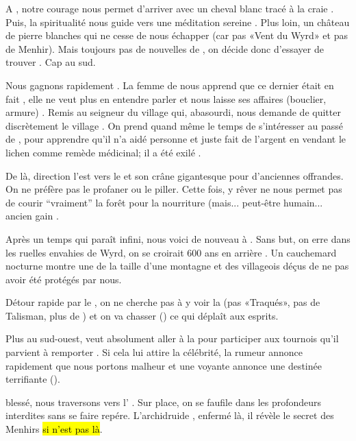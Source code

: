 \documentclass[11pt]{article}
\begin{document}
A \murmures{}, notre courage nous permet d'arriver avec un cheval blanc tracé à la craie . Puis, la spiritualité nous guide vers une méditation sereine . Plus loin, un château de pierre blanches qui ne cesse de nous échapper (car pas «Vent du Wyrd» et pas de Menhir). Mais toujours pas de nouvelles de \neante{}, on décide donc d'essayer de trouver \orrin{}. Cap au sud.

Nous gagnons rapidement \blanc{}. La femme de \fael{} nous apprend que ce dernier était en fait \galaad{}, elle ne veut plus en entendre parler et nous laisse ses affaires (bouclier, armure) . Remis au seigneur du village qui, abasourdi, nous demande de quitter discrètement le village . On prend quand même le temps de s'intéresser au passé de \breagach{}, pour apprendre qu'il n'a aidé personne et juste fait de l'argent en vendant le lichen comme remède médicinal; il a été exilé .

De là, direction l'est vers le \bosquet{}  et son crâne gigantesque pour d'anciennes offrandes. On ne préfère pas le profaner ou le piller. Cette fois, y rêver ne nous permet pas de courir ``vraiment'' la forêt pour la nourriture (mais... peut-être humain... ancien gain .

Après un temps qui paraît infini, nous voici de nouveau à \cuanacht{}. Sans but, on erre dans les ruelles envahies de Wyrd, on se croirait 600 ans en arrière \gain{\terror[3], \magic[1]}. Un cauchemard nocturne montre une \guivre{} de la taille d'une montagne et des villageois déçus de ne pas avoir été protégés par nous.

Détour rapide par le \lacmiroir{}, on ne cherche pas à y voir la \dame{} (pas «Traqués», pas de Talisman, plus de \fauxgraal{}) et on va chasser () ce qui déplaît aux esprits.

Plus au sud-ouest, \beor{} veut absolument aller à la \foire{} pour participer aux tournois qu'il parvient à remporter . Si cela lui attire la célébrité, la rumeur annonce rapidement que nous portons malheur et une voyante annonce une destinée terrifiante  (\beor{}).

\beor{} blessé, nous traversons vers l'\hospice{} . Sur place, on se faufile dans les profondeurs interdites sans se faire repére. L'archidruide \guivrarpion{}, enfermé là, il révèle le secret des Menhirs  \hl{si \larve{} n'est pas l\`a}.

\printindex
\end{document}

